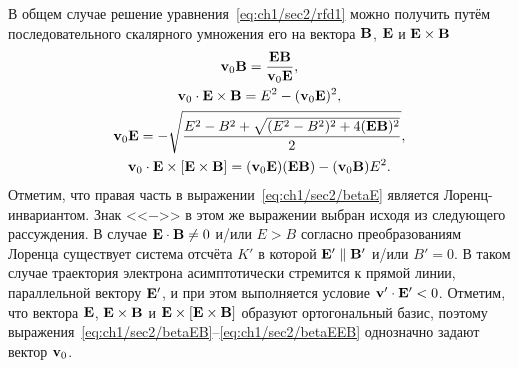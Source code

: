 В общем случае решение уравнения~\eqref{eq:ch1/sec2/rfd1} можно получить путём последовательного скалярного умножения его на вектора $\vb{B}$, $\vb{E}$ и $\vb{E}\times\vb{B}$
\begin{gather}
    \label{eq:ch1/sec2/betaB}
    \vb{v}_0\vb{B} = \frac{\vb{E}\vb{B}}{\vb{v}_0\vb{E}}, \\
    \label{eq:ch1/sec2/betaEB}
    \vb{v}_0 \cdot \vb{E} \times \vb{B} = E^2 - (\vb{v}_0 \vb{E})^2, \\
    \label{eq:ch1/sec2/betaE}
    \vb{v}_0\vb{E} = -\sqrt{\frac{E^2 - B^2 + \sqrt{(E^2-B^2)^2 +
    4(\vb{E}\vb{B})^2}}{2}}, \\
    \label{eq:ch1/sec2/betaEEB}
    \vb{v}_0 \cdot \vb{E} \times [\vb{E} \times \vb{B}] = (\vb{v}_0 \vb{E}) (\vb{E} \vb{B}) -
    (\vb{v}_0 \vb{B}) E^2.
\end{gather}
Отметим, что правая часть в выражении~\eqref{eq:ch1/sec2/betaE} является Лоренц-инвариантом. 
Знак <<$-$>> в этом же выражении выбран исходя из следующего рассуждения.
В случае $\vb{E}\cdot\vb{B} \neq 0$ и/или $E > B$ согласно преобразованиям Лоренца существует система отсчёта $K'$ в которой $\vb{E}'
\parallel\vb{B}'$ и/или $B'=0$.
В таком случае траектория электрона асимптотически стремится к прямой линии, параллельной вектору $\vb{E}'$, и при этом выполняется условие $\vb{v}'\cdot\vb{E}' < 0$.
Отметим, что вектора $\vb{E}$, $\vb{E}\times\vb{B}$ и $\vb{E}\times[\vb{E}\times\vb{B}]$ образуют ортогональный базис, поэтому выражения~\eqref{eq:ch1/sec2/betaEB}--\eqref{eq:ch1/sec2/betaEEB} однозначно задают вектор $\vb{v}_0$.

